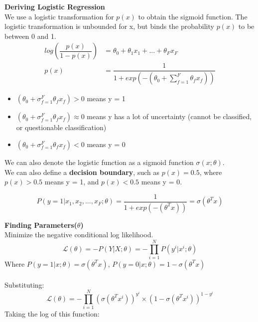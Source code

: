 \documentclass[a4paper,10pt]{article}
\begin{document}
\noindent \textcolor{Periwinkle}{\textbf{Deriving Logistic Regression}}\\
We use a logistic transformation for $p(x)$ to obtain the sigmoid function. The logistic transformation is unbounded for x, but binds the probability $p(x)$ to be between 0 and 1. 
\begin{align*}
	log(\dfrac{p(x)}{1-p(x)}) &= \theta_{0} + \theta_{1}x_{1} + ... + \theta_{F}x_{F} \\
	p(x) &= \dfrac{1}{1 + exp(-(\theta_{0} + \sum_{f=1}^{F}\theta_{f}x_{f}))}
\end{align*}
\begin{itemize}
	\item $(\theta_{0} + \sigma_{f=1}^{F}\theta_{f}x_{f}) > 0$ means y = 1
	\item $(\theta_{0} + \sigma_{f=1}^{F}\theta_{f}x_{f}) \approx 0$ means y  has a lot of uncertainty (cannot be classified, or questionable classification)
	\item $(\theta_{0} + \sigma_{f=1}^{F}\theta_{f}x_{f}) < 0$ means y = 0 \\
\end{itemize}
We can also denote the logistic function as a sigmoid function $\sigma(x;\theta)$. \\
We can also define a \textbf{decision boundary}, such as $p(x) = 0.5$, where $p(x) > 0.5$ means y = 1, and $p(x) < 0.5$ means y = 0.  
\begin{shaded}
	\begin{equation*}
		P(y=1|x_{1}, x_{2}, ... , x_{F};\theta) = \dfrac{1}{1+exp(-(\theta^{T}x))} = \sigma(\theta^{T}x)
	\end{equation*}
\end{shaded}
\newpage
\noindent \textcolor{Periwinkle}{\textbf{Finding Parameters($\theta$)}}\\
Minimize the negative conditional log likelihood. \\
\begin{equation*}
	\mathcal{L}(\theta) = -P(Y|X;\theta) = - \prod_{i=1}^{N}P(y^{i}|x^{i};\theta)
\end{equation*}
Where $P(y=1|x;\theta) = \sigma(\theta^{T}x)$, $P(y=0|x;\theta) = 1 - \sigma(\theta^{T}x)$ \\\\
Substituting: 
\begin{equation*}
	\mathcal{L}(\theta) = - \prod_{i=1}^{N}(\sigma(\theta^{T}x^{i}))^{y^{i}} \times (1 - \sigma(\theta^{T}x^{i}))^{1-y^{i}}
\end{equation*}
Taking the log of this function: 
\end{document}
